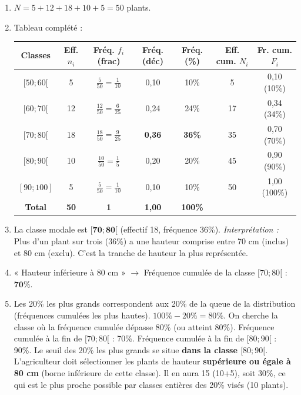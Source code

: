 \documentclass[11pt]{article}
\begin{document}
\begin{corrige}
\begin{enumerate}
    \item $N = 5 + 12 + 18 + 10 + 5 = 50$ plants.
    \item Tableau complété :
    \begin{center}
    \begin{tabular}{|c|c|c|c|c|c|c|}\hline
    \textbf{Classes} & \textbf{Eff. $n_i$} & \textbf{Fréq. $f_i$ (frac)} & \textbf{Fréq. (déc)} & \textbf{Fréq. (\%)} & \textbf{Eff. cum. $N_i$} & \textbf{Fr. cum. $F_i$} \\ \hline
    $[50 ; 60[$ & 5 & $\frac{5}{50}=\frac{1}{10}$ & 0,10 & 10\% & 5 & 0,10 (10\%) \\ \hline
    $[60 ; 70[$ & 12 & $\frac{12}{50}=\frac{6}{25}$ & 0,24 & 24\% & 17 & 0,34 (34\%) \\ \hline
    $[70 ; 80[$ & 18 & $\frac{18}{50}=\frac{9}{25}$ & \textbf{0,36} & \textbf{36\%} & 35 & 0,70 (70\%) \\ \hline
    $[80 ; 90[$ & 10 & $\frac{10}{50}=\frac{1}{5}$ & 0,20 & 20\% & 45 & 0,90 (90\%) \\ \hline
    $[90 ; 100]$ & 5 & $\frac{5}{50}=\frac{1}{10}$ & 0,10 & 10\% & 50 & 1,00 (100\%) \\ \hline
    \textbf{Total} & \textbf{50} & \textbf{1} & \textbf{1,00} & \textbf{100\%} & & \\ \hline
    \end{tabular}
    \end{center}
    \item La classe modale est $\boldsymbol{[70 ; 80[}$ (effectif 18, fréquence 36\%). \emph{Interprétation :} Plus d'un plant sur trois (36\%) a une hauteur comprise entre 70 cm (inclus) et 80 cm (exclu). C'est la tranche de hauteur la plus représentée.
    \item « Hauteur inférieure à 80 cm » $\rightarrow$ Fréquence cumulée de la classe $[70 ; 80[$ : $\boldsymbol{70\%}$.
    \item Les 20\% les plus grands correspondent aux 20\% de la queue de la distribution (fréquences cumulées les plus hautes).
    $100\% - 20\% = 80\%$. On cherche la classe où la fréquence cumulée dépasse 80\% (ou atteint 80\%).
    Fréquence cumulée à la fin de $[70 ; 80[$ : 70\%.
    Fréquence cumulée à la fin de $[80 ; 90[$ : 90\%.
    Le seuil des 20\% les plus grands se situe \textbf{dans la classe $[80 ; 90[$}. L'agriculteur doit sélectionner les plants de hauteur \textbf{supérieure ou égale à 80 cm} (borne inférieure de cette classe). Il en aura 15 (10+5), soit 30\%, ce qui est le plus proche possible par classes entières des 20\% visés (10 plants).
\end{enumerate}
\end{corrige}
\end{document}
